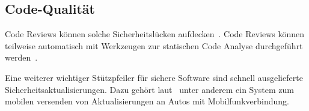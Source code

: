\subsection{Code-Qualität}
Code Reviews können solche Sicherheits\-lücken aufdecken~\cite{Howard2006}.
Code Reviews können teilweise automatisch mit Werkzeugen zur statischen Code
Analyse durchgeführt werden~\cite{McGraw2008}.

Eine weiterer wichtiger Stützpfeiler für sichere Software sind schnell
ausgelieferte Sicherheits\-aktualisierungen. Dazu gehört
laut~\cite{Mahaffey2015} unter anderem ein System zum mobilen versenden von
Aktualisierungen an Autos mit Mobilfunk\-verbindung.
